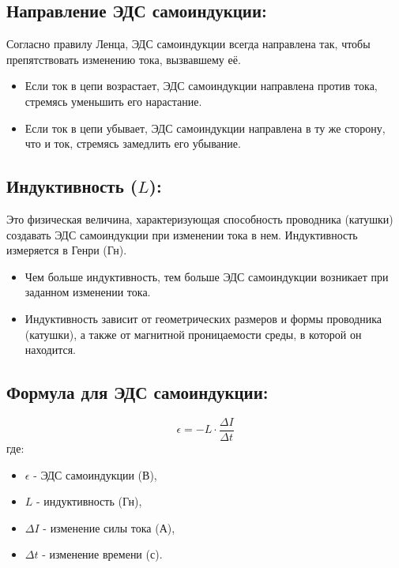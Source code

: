 \documentclass[a4paper,12pt]{article}
\begin{document}
\vspace{-9pt}
\subsection*{Направление ЭДС самоиндукции:}
\vspace{-3pt}
Согласно правилу Ленца, ЭДС самоиндукции всегда направлена так, чтобы препятствовать изменению тока, вызвавшему её.
\begin{itemize}
  \item Если ток в цепи возрастает, ЭДС самоиндукции направлена против тока, стремясь уменьшить его нарастание.
  \item Если ток в цепи убывает, ЭДС самоиндукции направлена в ту же сторону, что и ток, стремясь замедлить его убывание.
\end{itemize}

\vspace{-9pt}
\subsection*{Индуктивность ($L$):}
\vspace{-3pt}
Это физическая величина, характеризующая способность проводника (катушки) создавать ЭДС самоиндукции при изменении тока в нем. Индуктивность измеряется в Генри (Гн).
\begin{itemize}
  \item Чем больше индуктивность, тем больше ЭДС самоиндукции возникает при заданном изменении тока.
  \item Индуктивность зависит от геометрических размеров и формы проводника (катушки), а также от магнитной проницаемости среды, в которой он находится.
\end{itemize}

\vspace{-9pt}
\subsection*{Формула для ЭДС самоиндукции:}
\vspace{-3pt}
\vspace{-0.05em}
$$ \epsilon = -L \cdot \frac{\Delta I}{\Delta t} $$
где:
\begin{itemize}
\item $\epsilon$ - ЭДС самоиндукции (В),
\item $L$ - индуктивность (Гн),
\item $\Delta I$ - изменение силы тока (А),
\item $\Delta t$ - изменение времени (с).
\end{itemize}
\end{document}
